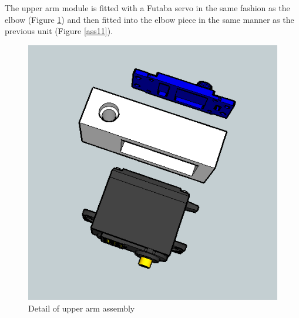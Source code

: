 

The upper arm module is fitted with a Futaba servo in the same fashion as the elbow (Figure \ref{ass9}) and then fitted into the elbow piece in the same manner as the previous unit (Figure \ref{ass11}).\\

	\begin{figure}[H]
			\centering
			\includegraphics[scale=0.5]{images/Assembly/9.png}
			\caption{Detail of upper arm assembly }
			\label{ass9}
	\end{figure}
	\bigskip










